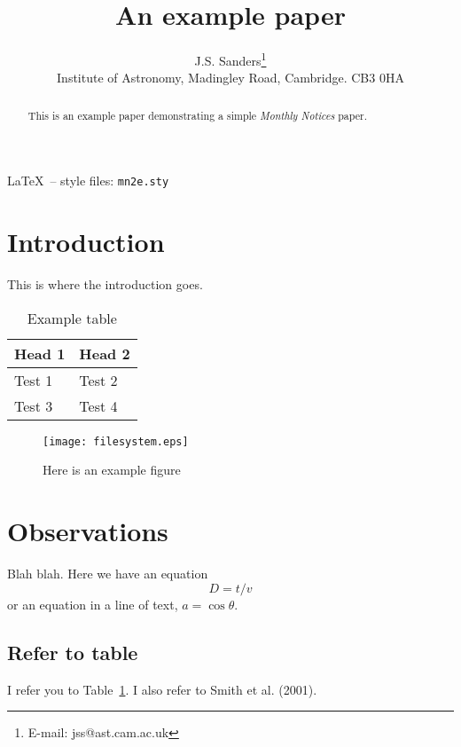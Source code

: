 \documentclass[usegraphicx]{mn2e}
\begin{document}
\title{An example paper}
\author[J.S. Sanders]
{J.S. Sanders\thanks{E-mail: jss@ast.cam.ac.uk}\\
Institute of Astronomy, Madingley Road, Cambridge. CB3 0HA}
\maketitle

\begin{abstract}
  This is an example paper demonstrating a simple \emph{Monthly
    Notices} paper.
\end{abstract}

\begin{keywords}
 \LaTeX\ -- style files: \verb"mn2e.sty"\
\end{keywords}

\section{Introduction}
This is where the introduction goes.

\begin{table}
  \begin{tabular}{ll}
    Head 1 & Head 2 \\ \hline
    Test 1 & Test 2 \\
    Test 3 & Test 4 \\
  \end{tabular}
  \caption{Example table}
  \label{tab:example}
\end{table}

\begin{figure}
  \centering  %
  \texttt{[image: filesystem.eps]}
  \caption{Here is an example figure}
  \label{fig:example}
\end{figure}

\section{Observations}
Blah blah. Here we have an equation
\begin{equation}
  D = t / v
\end{equation}
or an equation in a line of text, $a = \cos \theta$.

\subsection{Refer to table}
I refer you to Table~\ref{tab:example}. I also refer to Smith et al.
(2001).
\end{document}
